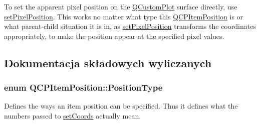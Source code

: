 To set the apparent pixel position on the \hyperlink{class_q_custom_plot}{Q\+Custom\+Plot} surface directly, use \hyperlink{class_q_c_p_item_position_a8d4f858f2089973967cf9cb81970ef0a}{set\+Pixel\+Position}. This works no matter what type this \hyperlink{class_q_c_p_item_position}{Q\+C\+P\+Item\+Position} is or what parent-\/child situation it is in, as \hyperlink{class_q_c_p_item_position_a8d4f858f2089973967cf9cb81970ef0a}{set\+Pixel\+Position} transforms the coordinates appropriately, to make the position appear at the specified pixel values. 

\subsection{Dokumentacja składowych wyliczanych}
\subsubsection[{\texorpdfstring{Position\+Type}{PositionType}}]{\setlength{\rightskip}{0pt plus 5cm}enum {\bf Q\+C\+P\+Item\+Position\+::\+Position\+Type}}\hypertarget{class_q_c_p_item_position_aad9936c22bf43e3d358552f6e86dbdc8}{}\label{class_q_c_p_item_position_aad9936c22bf43e3d358552f6e86dbdc8}
Defines the ways an item position can be specified. Thus it defines what the numbers passed to \hyperlink{class_q_c_p_item_position_aa988ba4e87ab684c9021017dcaba945f}{set\+Coords} actually mean.

